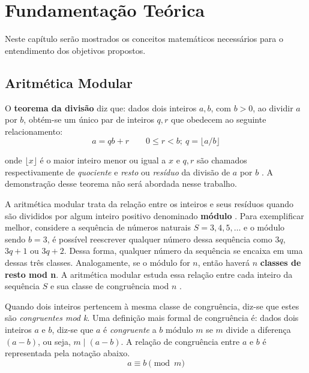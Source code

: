\chapter{Fundamentação Teórica}
Neste capítulo serão mostrados os conceitos matemáticos necessários para o entendimento dos objetivos propostos.

%
%
\section{Aritmética Modular}

O \textbf{teorema da divisão} diz que: dados dois inteiros $a, b$, com $b > 0$, ao dividir \(a\) por \(b\), obtém-se um único par de inteiros $q, r$ que obedecem ao seguinte relacionamento:
\begin{equation}
  a=qb+r \qquad 0 \leq r<b;\ q=\lfloor a/b \rfloor
\end{equation}

onde $\lfloor x \rfloor$ é o maior inteiro menor ou igual a \(x\) e $q,r$ são chamados respectivamente de \textit{quociente} e \textit{resto} ou \textit{resíduo} da divisão de \(a\) por \(b\) \cite{Santos:2014}. A demonstração desse teorema não será abordada nesse trabalho.

A aritmética modular trata da relação entre os inteiros e seus resíduos quando são divididos por algum inteiro positivo denominado \textbf{módulo} \cite{Lewinter:2015}. Para exemplificar melhor, considere a sequência de números naturais $S = 3, 4, 5, \dots$ e o módulo sendo $b = 3$, é possível reescrever qualquer número dessa sequência como \(3q\), \(3q + 1\) ou \(3q + 2\). Dessa forma, qualquer número da sequência se encaixa em uma dessas três classes. Analogamente, se o módulo for \(n\), então haverá \(n\) \textbf{classes de resto mod n}. A aritmética modular estuda essa relação entre cada inteiro da sequência \(S\) e sua classe de congruência mod \(n\) \cite{Lewinter:2015}.

Quando dois inteiros pertencem à mesma classe de congruência, diz-se que estes são \textit{congruentes mod k}. Uma definição mais formal de congruência é: dados dois inteiros \(a\) e \(b\), diz-se que \(a\) é \textit{congruente} a \(b\) módulo \(m\) se \(m\) divide a diferença $(a-b)$, ou seja, $m \mid (a-b)$. A relação de congruência entre \(a\) e \(b\) é representada pela notação abaixo.
\begin{equation}
  a \equiv b \pmod m \label{eq:1}
\end{equation}

